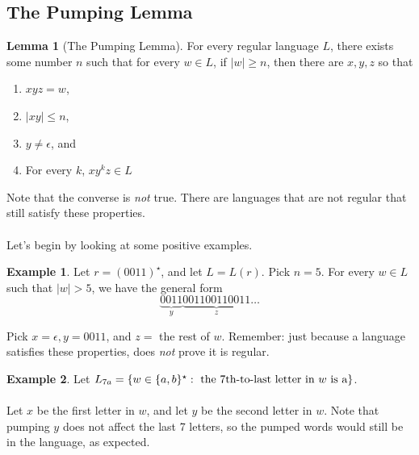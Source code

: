 \documentclass[]{article}
\DeclarePairedDelimiter{\set}{\lbrace}{\rbrace}
\theoremstyle{definition}
\newtheorem*{lemma}{Lemma}
\newtheorem{ex}{Example}[section]
\begin{document}
      \subsection{The Pumping Lemma}
       \begin{lemma}[The Pumping Lemma]
          For every regular language $L$, there exists some number $n$ such that for every $w \in L$, if $|w| \ge n$, then there are $x, y, z$ so that
          \begin{enumerate}
            \item $xyz = w$,
            \item $|xy| \le n$,
            \item $y \ne \epsilon$, and
            \item For every $k$, $xy^k z \in L$
          \end{enumerate}
        \end{lemma}

        Note that the converse is \emph{not} true. There are languages that are not regular that still satisfy these properties.
        \\ \\
        Let's begin by looking at some positive examples.
        \begin{ex}
          Let $r = (0011)^\star$, and let $L = L(r)$. Pick $n = 5$. For every $w \in L$ such that $|w| > 5$, we have the general form
          $$
            \underbrace{0011}_{y} \underbrace{001100110011}_{z} \ldots
          $$

          Pick $x = \epsilon, y = 0011$, and $z = $ the rest of $w$. Remember: just because a language satisfies these properties, does \emph{not} prove it is regular.
        \end{ex}

        \begin{ex}
          Let $L_{7a} = \set{ w \in \set{a, b}^\star : \text{ the 7th-to-last letter in } w \text{ is a}}$.
          \\ \\
          Let $x$ be the first letter in $w$, and let $y$ be the second letter in $w$. Note that pumping $y$ does not affect the last 7 letters, so the pumped words would still be in the language, as expected.
        \end{ex}
\end{document}
